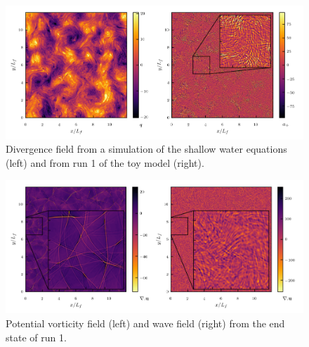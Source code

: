   
\begin{figure}[h]
\centerline{\includegraphics[angle=0,width=18.5cm]{./fig8.pdf}}
\caption{Divergence field from a simulation of the shallow water equations (left) and from run 1 of the toy model (right). }
\label{Shocks}
 \end{figure}

\begin{figure}[h]
\centerline{\includegraphics[angle=0,width=18.5cm]{./fig9.pdf}}
\caption{Potential vorticity field (left) and wave field (right) from the end state of run 1.}
\label{Vis1}
\end{figure}

